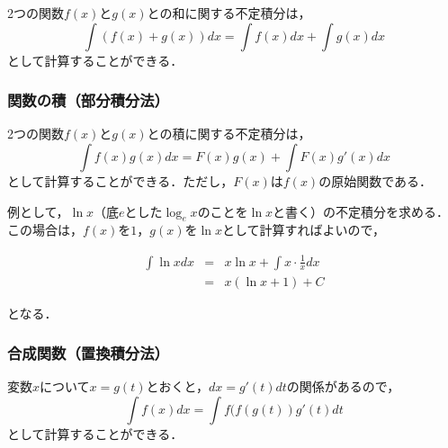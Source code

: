 2つの関数$f(x)$と$g(x)$との和に関する不定積分は，
\begin{equation}
\int(f(x)+g(x))dx = \int f(x)dx +\int g(x)dx
\end{equation}
として計算することができる．

\subsubsection{関数の積（部分積分法）}

2つの関数$f(x)$と$g(x)$との積に関する不定積分は，
\begin{equation}
\int f(x)g(x) dx = F(x) g(x)+\int F(x)g'(x)dx
\end{equation}
として計算することができる．ただし，$F(x)$は$f(x)$の原始関数である．

例として，$\ln x$（底$e$とした$\log_{e}x$のことを$\ln x$と書く）の不定積分を求める．この場合は，$f(x)$を$1$，$g(x)$を$\ln x$として計算すればよいので，

\begin{eqnarray}
\int \ln x dx &=& x \ln x +\int x \cdot \frac{1}{x} dx \nonumber \\
 &=& x (\ln x +1) +C
\end{eqnarray}

\noindent となる．

\subsubsection{合成関数（置換積分法）}

変数$x$について$x=g(t)$とおくと，$dx=g'(t)dt$の関係があるので，
\begin{equation}
\int f(x)dx = \int f(f(g(t))g'(t)dt
\end{equation}
として計算することができる．

